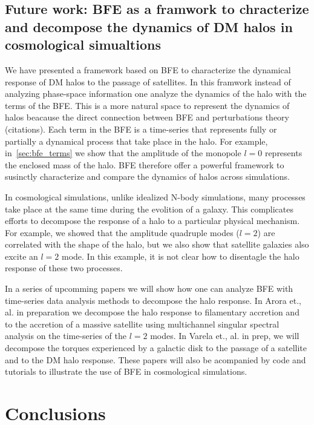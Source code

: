 \documentclass[twocolumn, linenumbers]{openjournal}
\begin{document}
\subsection{Future work: BFE as a framwork to chracterize and decompose the dynamics of DM halos 
in cosmological simualtions}

We have presented a framework based on BFE to characterize the dynamical response of DM halos 
to the passage of satellites. In this framwork instead of analyzing phase-space information
one analyze the dynamics of the halo with the terms of the BFE. This is a more natural space to represent
the dynamics of halos beacause the direct connection between BFE and perturbations theory (citations).
Each term in the BFE is a time-series that represents fully or partially a dynamical process that 
take place in the halo. For example, in~\ref{sec:bfe_terms} we show that the amplitude of the 
monopole $l=0$ represents the enclosed mass of the halo. BFE therefore offer a powerful framework 
to susinctly characterize and compare the dynamics of halos across simulations. 

In cosmological simulations, unlike idealized N-body simulations, many processes take place at the same
time during the evolition of a galaxy. This complicates efforts to decompose the response of a halo
to a particular physical mechanism. For example, we showed that the amplitude quadruple modes ($l=2$) 
are correlated with the shape of the halo, but we also show that satellite galaxies also 
excite an $l=2$ mode. In this example, it is not clear how to disentagle the halo response of these 
two processes. 

In a series of upcomming papers we will show how one can analyze BFE with time-series data analysis methods
to decompose the halo response. In Arora et., al. in preparation we decompose the halo response to 
filamentary accretion and  to the accretion of a massive satellite using multichannel singular spectral analysis
on the time-series of the $l=2$ modes. In Varela et., al. in prep, we will decompose the torques experienced
by a galactic disk to the passage of a satellite and to the DM halo response. These papers
will also be acompanied by code and tutorials to illustrate the use of BFE in cosmological simulations.  

\section{Conclusions}\label{sec:conclusions}
\end{document}
